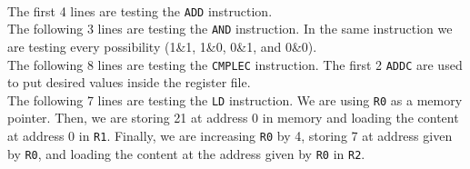 \documentclass[a4paper, 10pt, oneside]{article}
\begin{document}
\paragraph{}The first 4 lines are testing the \texttt{ADD} instruction.\\
The following 3 lines are testing the \texttt{AND} instruction. In the same instruction we are testing every possibility (1\&1, 1\&0, 0\&1, and 0\&0).\\
The following 8 lines are testing the \texttt{CMPLEC} instruction. The first 2 \texttt{ADDC} are used to put desired values inside the register file.\\
The following 7 lines are testing the \texttt{LD} instruction. We are using \texttt{R0} as a memory pointer. Then, we are storing 21 at address 0 in memory and loading the content at address 0 in \texttt{R1}. Finally, we are increasing \texttt{R0} by 4, storing 7 at address given by \texttt{R0}, and loading the content at the address given by \texttt{R0} in \texttt{R2}.
\end{document}
